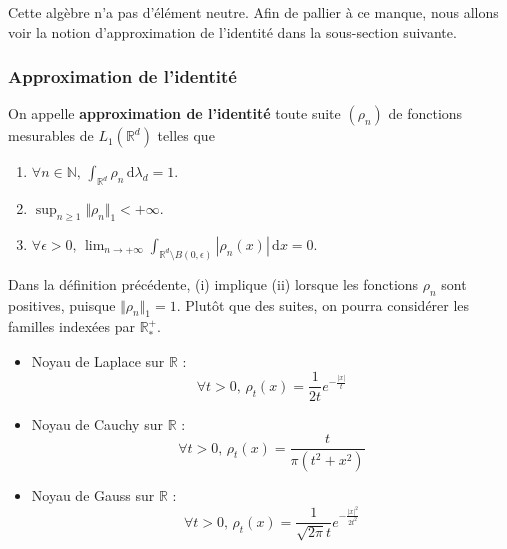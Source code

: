   \begin{remark}
    Cette algèbre n'a pas d'élément neutre. Afin de pallier à ce manque, nous allons voir la notion d'approximation de l'identité dans la sous-section suivante.
  \end{remark}

  \subsubsection{Approximation de l'identité}


  \begin{definition}
    On appelle \textbf{approximation de l'identité} toute suite $(\rho_n)$ de fonctions mesurables de $L_1(\mathbb{R}^d)$ telles que
    \begin{enumerate}[label={\bfseries(\roman*)}]
      \item $\forall n \in \mathbb{N}, \, \int_{\mathbb{R}^d} \rho_n \, \mathrm{d}\lambda_d = 1$.
      \item $\sup_{n \geq 1} \Vert \rho_n \Vert_1 < +\infty$.
      \item $\forall \epsilon > 0, \, \lim_{n \rightarrow +\infty} \int_{\mathbb{R}^d \setminus B(0, \epsilon)} |\rho_n(x)| \, \mathrm{d}x = 0$.
    \end{enumerate}
  \end{definition}

  \begin{remark}
    Dans la définition précédente, (i) implique (ii) lorsque les fonctions $\rho_n$ sont positives, puisque $\Vert\rho_n\Vert_1=1$. Plutôt que des suites, on pourra considérer les familles indexées par $\mathbb{R}_*^+$.
  \end{remark}

  \begin{example}
    \begin{itemize}
      \item Noyau de Laplace sur $\mathbb{R}$ :
      \[ \forall t > 0, \, \rho_t(x) = \frac{1}{2t}e^{-\frac{|x|}{t}} \]
      \item Noyau de Cauchy sur $\mathbb{R}$ :
      \[ \forall t > 0, \, \rho_t(x) = \frac{t}{\pi (t^2 + x^2)} \]
      \item Noyau de Gauss sur $\mathbb{R}$ :
      \[ \forall t > 0, \, \rho_t(x) = \frac{1}{\sqrt{2\pi} t}e^{-\frac{|x|^2}{2t^2}} \]
    \end{itemize}
  \end{example}

